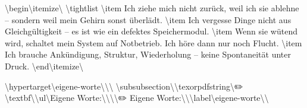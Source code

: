 \textbackslash{}begin\textbackslash{}{itemize\textbackslash{}}
\textbackslash{}tightlist
\textbackslash{}item
  Ich ziehe mich nicht zurück, weil ich sie ablehne -- sondern weil mein Gehirn sonst überlädt.
\textbackslash{}item
  Ich vergesse Dinge nicht aus Gleichgültigkeit -- es ist wie ein defektes Speichermodul.
\textbackslash{}item
  Wenn sie wütend wird, schaltet mein System auf Notbetrieb. Ich höre dann nur noch Flucht.
\textbackslash{}item
  Ich brauche Ankündigung, Struktur, Wiederholung -- keine Spontaneität unter Druck.
\textbackslash{}end\textbackslash{}{itemize\textbackslash{}}

\textbackslash{}hypertarget\textbackslash{}{eigene-worte\textbackslash{}}\textbackslash{}{\textbackslash{}%
\textbackslash{}subsubsection\textbackslash{}{\textbackslash{}texorpdfstring\textbackslash{}{✏️ \textbackslash{}textbf\textbackslash{}{\textbackslash{}ul\textbackslash{}{Eigene Worte:\textbackslash{}}\textbackslash{}}\textbackslash{}}\textbackslash{}{✏️ Eigene Worte:\textbackslash{}}\textbackslash{}}\textbackslash{}label\textbackslash{}{eigene-worte\textbackslash{}}\textbackslash{}}


